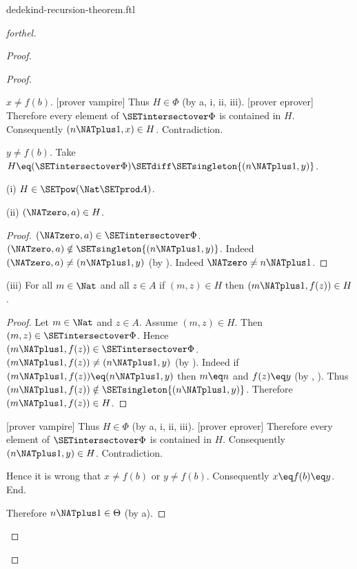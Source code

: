 \documentclass{naproche-library}
\begin{document}
\begin{smodule}[title=Dedekind's Recursion Theorem]{dedekind-recursion-theorem.ftl}
\begin{proof}[forthel]
\begin{proof}
\begin{proof}
\begin{case}{$x \neq f(b)$.}
          [prover vampire]
          Thus $H \in \Phi$ (by a, i, ii, iii).
          [prover eprover]
          Therefore every element of $\SETintersectover \Phi$ is contained in $H$.
          Consequently $(n \NATplus 1,x) \in H$.
          Contradiction.
        \end{case}

        \begin{case}{$y \neq f(b)$.}
          Take $H \eq (\SETintersectover \Phi) \SETdiff \SETsingleton{(n \NATplus 1,y)}$.

          (i) $H \in \SETpow(\Nat \SETprod A)$.

          (ii) $(\NATzero,a) \in H$.
          \begin{proof}
            $(\NATzero,a) \in \SETintersectover \Phi$.
            $(\NATzero,a) \notin \SETsingleton{(n \NATplus 1,y)}$.
            Indeed $(\NATzero,a) \neq (n \NATplus 1,y)$ (by ).
            Indeed $\NATzero \neq n \NATplus 1$.
          \end{proof}

          (iii) For all $m \in \Nat$ and all $z \in A$ if $(m,z) \in H$ then $(m \NATplus 1,f(z)) \in H$.
          \begin{proof}
            Let $m \in \Nat$ and $z \in A$.
            Assume $(m,z) \in H$.
            Then $(m,z) \in \SETintersectover \Phi$.
            Hence $(m \NATplus 1,f(z)) \in \SETintersectover \Phi$.
            $(m \NATplus 1,f(z)) \neq (n \NATplus 1,y)$ (by ).
            Indeed if $(m \NATplus 1,f(z)) \eq (n \NATplus 1,y)$ then $m \eq n$ and $f(z) \eq y$ (by , ).
            Thus $(m \NATplus 1,f(z)) \notin \SETsingleton{(n \NATplus 1,y)}$.
            Therefore $(m \NATplus 1,f(z)) \in H$.
          \end{proof}

          [prover vampire]
          Thus $H \in \Phi$ (by a, i, ii, iii).
          [prover eprover]
          Therefore every element of $\SETintersectover \Phi$ is contained in $H$.
          Consequently $(n \NATplus 1,y) \in H$.
          Contradiction.
        \end{case}

        Hence it is wrong that $x \neq f(b)$ or $y \neq f(b)$.
        Consequently $x \eq f(b) \eq y$.
      End.

      Therefore $n \NATplus 1 \in \Theta$ (by a).
    \end{proof}


\end{proof}
\end{proof}
\end{smodule}
\end{document}
